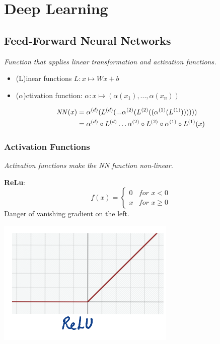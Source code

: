 \section{Deep Learning}
\subsection{Feed-Forward Neural Networks}
\textit{Function that applies linear transformation and activation functions.}

\begin{itemize}
	\item (L)inear functions $L: x\mapsto Wx + b$
	\item ($\alpha$)ctivation function: $\alpha: x \mapsto (\alpha(x_1), ..., \alpha(x_n))$
\end{itemize}

\begin{align*}
		\mathit{NN}(x) 	&= \alpha^{(d)} (L^{(d)} (...\alpha^{(2)}(L^{(2)}((\alpha^{(1)}(L^{(1)})))))) \\
				&= \alpha^{(d)} \circ L^{(d)} \hdots \alpha^{(2)} \circ L^{(2)} \circ \alpha^{(1)} \circ L^{(1)}(x)
	\end{align*}

\subsubsection{Activation Functions}
\textit{Activation functions make the NN function non-linear.
}\vspace{1em}

\begin{minipage}{0.45\columnwidth}
\textbf{ReLu}: 
$$
	f(x) = \begin{cases}
		0 &\textit{for $x<0$} \\
		x &\textit{for $x\geq 0$}
	\end{cases}
$$
Danger of vanishing gradient on the left.
\end{minipage}
\begin{minipage}{0.4\columnwidth}
	\includegraphics[width=\columnwidth]{images/10-relu}
\end{minipage}

